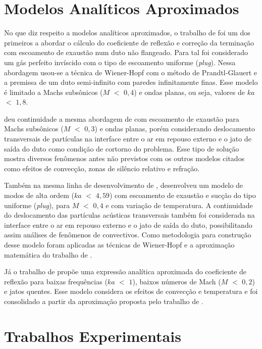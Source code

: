 \section{Modelos Analíticos Aproximados}

No que diz respeito a modelos analíticos aproximados, o trabalho de  foi um dos primeiros a abordar o cálculo do coeficiente de reflexão e correção da terminação com escoamento de exaustão num duto não flangeado. Para tal foi considerado um gás perfeito invíscido com o tipo de escoamento uniforme (\textit{plug}). Nessa abordagem usou-se a técnica de Wiener-Hopf com o método de Prandtl-Glauert e a premissa de um duto semi-infinito com paredes infinitamente finas. Esse modelo é limitado a Machs subsônicos ($M$ $<$ $0,4$) e ondas planas, ou seja, valores de $ka$ $<$ $1,8$.

 deu continuidade a mesma abordagem de  com escoamento de exaustão para Machs subsônicos ($M$ $<$ $0,3$) e ondas planas, porém considerando deslocamento transversais de partículas na interface entre o ar em repouso externo e o jato de saída do duto como condição de cortorno do problema. Esse tipo de solução mostra diversos fenômenos antes não previstos com os outros modelos citados como efeitos de convecção, zonas de silêncio relativo e refração.

Também na mesma linha de desenvolvimento de ,  desenvolveu um modelo de modos de alta ordem ($ka$ $<$ $4,59$) com escoamento de exaustão e sucção do tipo uniforme (\textit{plug}), para $M$ $<$ $0,4$ e com variação de temperatura. A continuidade do deslocamento das partículas acústicas transversais também foi considerada na interface entre o ar em repouso externo e o jato de saída do duto, possibilitando assim análises de fenômenos de convectivos. Como metodologia para construção desse modelo foram aplicadas as técnicas de Wiener-Hopf e a aproximação matemática do trabalho de .

Já o trabalho de  propõe uma expressão analítica aproximada do coeficiente de reflexão para baixas frequências ($ka$ $<$ $1$), baixos números de Mach ($M$ $<$ $0,2$) e jatos quentes. Esse modelo considera os efeitos de convecção e temperatura e foi consolidado a partir da aproximação proposta pelo trabalho de .   

\section{Trabalhos Experimentais}

